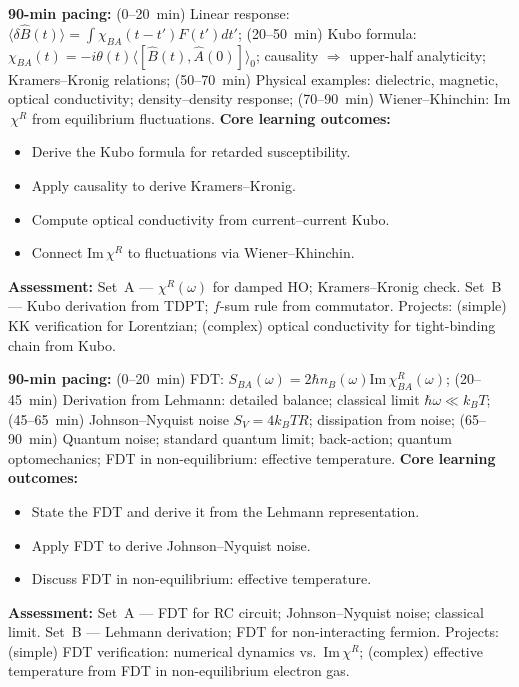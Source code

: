 \documentclass[11pt,a4paper]{article}
\begin{document}
\medskip

\begin{tcolorbox}[modulebox, title={Module~II.6 / L03: Linear Response Theory and the Kubo Formula}]
\textbf{90-min pacing:} (0--20~min) Linear response: $\langle\delta\hat{B}(t)\rangle=\int\chi_{BA}(t-t')F(t')dt'$; (20--50~min) Kubo formula: $\chi_{BA}(t)=-i\theta(t)\langle[\hat{B}(t),\hat{A}(0)]\rangle_0$; causality $\Rightarrow$ upper-half analyticity; Kramers--Kronig relations; (50--70~min) Physical examples: dielectric, magnetic, optical conductivity; density--density response; (70--90~min) Wiener--Khinchin: Im$\,\chi^R$ from equilibrium fluctuations.
\medskip\textbf{Core learning outcomes:}
\begin{itemize}[leftmargin=1.4em,topsep=2pt,itemsep=1pt]
  \item Derive the Kubo formula for retarded susceptibility.
  \item Apply causality to derive Kramers--Kronig.
  \item Compute optical conductivity from current--current Kubo.
  \item Connect Im$\,\chi^R$ to fluctuations via Wiener--Khinchin.
\end{itemize}
\medskip\textbf{Assessment:}
Set~A --- $\chi^R(\omega)$ for damped HO; Kramers--Kronig check.
Set~B --- Kubo derivation from TDPT; $f$-sum rule from commutator.
Projects: (simple) KK verification for Lorentzian; (complex) optical conductivity for tight-binding chain from Kubo.
\end{tcolorbox}

\medskip

\begin{tcolorbox}[modulebox, title={Module~II.6 / L04: The Fluctuation--Dissipation Theorem}]
\textbf{90-min pacing:} (0--20~min) FDT: $S_{BA}(\omega)=2\hbar n_B(\omega)\text{Im}\,\chi^R_{BA}(\omega)$; (20--45~min) Derivation from Lehmann: detailed balance; classical limit $\hbar\omega\ll k_BT$; (45--65~min) Johnson--Nyquist noise $S_V=4k_BTR$; dissipation from noise; (65--90~min) Quantum noise; standard quantum limit; back-action; quantum optomechanics; FDT in non-equilibrium: effective temperature.
\medskip\textbf{Core learning outcomes:}
\begin{itemize}[leftmargin=1.4em,topsep=2pt,itemsep=1pt]
  \item State the FDT and derive it from the Lehmann representation.
  \item Apply FDT to derive Johnson--Nyquist noise.
  \item Discuss FDT in non-equilibrium: effective temperature.
\end{itemize}
\medskip\textbf{Assessment:}
Set~A --- FDT for RC circuit; Johnson--Nyquist noise; classical limit.
Set~B --- Lehmann derivation; FDT for non-interacting fermion.
Projects: (simple) FDT verification: numerical dynamics vs.\ Im$\,\chi^R$; (complex) effective temperature from FDT in non-equilibrium electron gas.
\end{tcolorbox}
\end{document}
